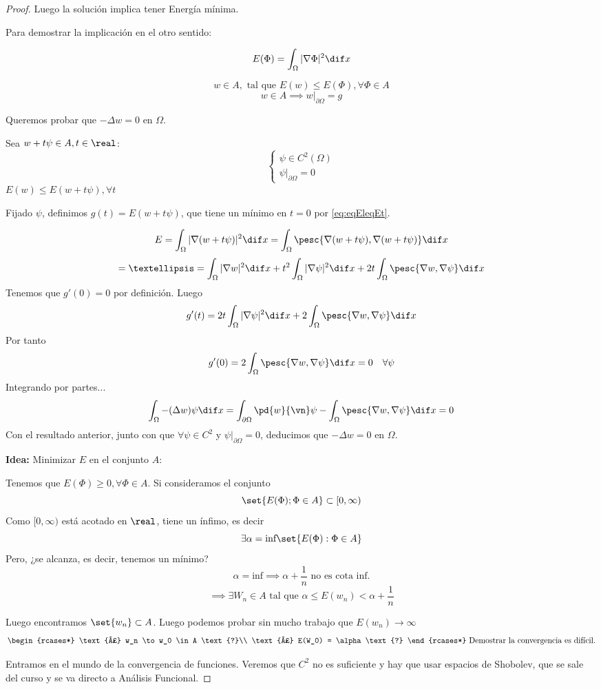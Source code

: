 \begin{proof}
		Luego la solución implica tener Energía mínima.

		\proofpart{$\Longleftarrow$}

		Para demostrar la implicación en el otro sentido:

		\[ E(\Phi) = \int_\Omega |\nabla \Phi|^2 \dif x \]

		\[ w \in A, \text{ tal que } E(w) \leq E(\Phi), \forall \Phi \in A\]
		\[ w \in A \implies w|_{\partial \Omega} = g\]

		Queremos probar que $-\Delta w = 0$ en $\Omega$.

		Sea $w+t\psi \in A, t \in \real$:
		\[\begin{cases}
			\psi \in C^2(\Omega)\\
			\psi|_{\partial \Omega} = 0
	\end{cases}\]
		\( E(w) \leq E(w + t \psi), \forall t \label{eq:eqEleqEt} \)

		Fijado $\psi$, definimos $g(t) = E(w + t \psi)$, que tiene un mínimo en $t=0$ por \ref{eq:eqEleqEt}.

		\[E= \int_\Omega | \nabla (w+t\psi)|^2 \dif x = \int_\Omega \pesc{\nabla (w+t\psi), \nabla(w + t \psi)} \dif x\]
		\[ = … = \int_\Omega |\nabla w|^2 \dif x + t^2 \int_\Omega |\nabla \psi|^2 \dif x + 2t\int_\Omega \pesc{\nabla w, \nabla \psi} \dif x \]
		Tenemos que $g'(0) = 0$ por definición. Luego
		\[ g'(t) = 2t \int_\Omega | \nabla \psi |^2 \dif x + 2 \int_\Omega \pesc{\nabla w, \nabla \psi} \dif x \]
		Por tanto
		\[ g'(0) = 2 \int_\Omega \pesc{\nabla w, \nabla \psi} \dif x = 0 \quad \forall \psi \]
		Integrando por partes...
		\[ \int_\Omega -(\Delta w)\psi \dif x = \int_{\partial \Omega} \pd{w}{\vn} \psi - \int_\Omega \pesc{\nabla w, \nabla \psi} \dif x  = 0 \]
		Con el resultado anterior, junto con que $\forall \psi \in C^2$ y $\psi|_{\partial\Omega} = 0$, deducimos que $-\Delta w = 0$ en $\Omega$.

		\textbf{Idea:} Minimizar $E$ en el conjunto $A$:

		Tenemos que $E(\Phi) \geq 0, \forall \Phi \in A$. Si consideramos el conjunto
			\[ \set{ E(\Phi); \Phi \in A} \subset [0, \infty) \]
		Como $[0, \infty)$ está acotado en $\real$, tiene un ínfimo, es decir
		\[ \exists \alpha = \text{inf}\set{E(\Phi) : \Phi \in A} \]
		Pero, ¿se alcanza, es decir, tenemos un mínimo?
		\[ \alpha = \text{inf} \implies \alpha + \frac{1}{n} \text{ no es cota inf.} \]
		\[ \implies \exists W_n \in A \text{ tal que } \alpha \leq E(w_n) < \alpha + \frac{1}{n} \]

		Luego encontramos $\set{w_n} \subset A$. Luego podemos probar sin mucho trabajo que $E(w_n) \rightarrow \infty$
		\[ \begin{rcases*}
			\text{¿} w_n \to w_0 \in A \text{?}\\
			\text{¿} E(W_0) = \alpha \text{?}
		\end{rcases*} \text{ Demostrar la convergencia es difícil.}
		\]

		Entramos en el mundo de la convergencia de funciones. Veremos que $C^2$ no es suficiente y hay que usar espacios de Shobolev, que se sale del curso y se va directo a Análisis Funcional.
		\end{proof}



